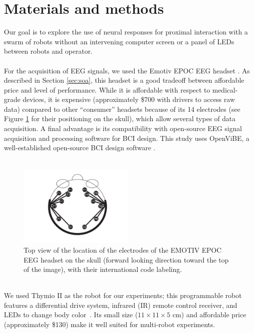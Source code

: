 \documentclass[smallextended]{svjour3}
\begin{document}
\section{Materials and methods}
\label{sec:methods}
Our goal is to explore the use of neural responses for proximal interaction with a swarm of robots without an intervening computer screen or a panel of LEDs between robots and operator. \\
\\
For the acquisition of EEG signals, we used the Emotiv EPOC EEG headset \cite{stytsenko2011evaluation}. 
As described in Section \ref{sec:soa}, this headset is a good tradeoff between affordable price and level of performance. 
While it is affordable with respect to medical-grade devices, it is expensive (approximately \$700 with drivers to access raw data) compared to other ``consumer'' headsets because of its 14 electrodes (see Figure \ref{fig:electrodes} for their positioning on the skull), which allow several types of data acquisition. 
A final advantage is its compatibility with open-source EEG signal acquisition and processing software for BCI design. This study uses OpenViBE, a well-established open-source BCI design software \cite{ov_publication}.\\
\\
\begin{figure}
\center
\includegraphics[width=0.5\textwidth]{figures/emotiv-electrodes.pdf}
\caption{Top view of the location of the electrodes of the EMOTIV EPOC EEG headset on the skull (forward looking direction toward the top of the image), with their international code labeling.} \label{fig:electrodes}
\end{figure}
\\
We used Thymio II as the robot for our experiments; this programmable robot features a differential drive system, infrared (IR) remote control receiver, and LEDs to change body color~\cite{Riedo-et-al-2013}. Its small size ($11 \times 11 \times 5$ cm) and affordable price (approximately \$130) make it well suited for multi-robot experiments. 
\end{document}
